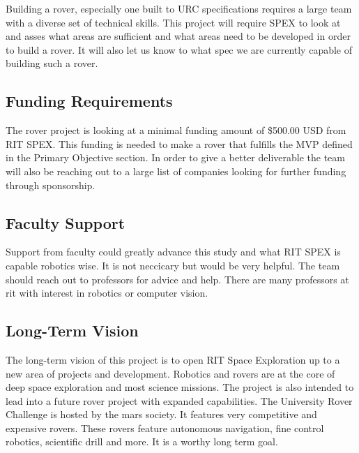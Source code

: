 \documentclass[conference]{IEEEtran} %
\begin{document}
Building a rover, especially one built to URC specifications requires a large team with a diverse set of technical skills. 
This project will require SPEX to look at and asses what areas are sufficient and what areas need to be developed in order to build a rover. 
It will also let us know to what spec we are currently capable of building such a rover. 

\subsection{Funding Requirements}

The rover project is looking at a minimal funding amount of \$500.00 USD from RIT SPEX. This funding is needed to make a rover that fulfills the MVP defined in the Primary Objective section. In order to give a better deliverable the team will also be reaching out to a large list of companies looking for further funding through sponsorship. 

\subsection{Faculty Support}
Support from faculty could greatly advance this study and what RIT SPEX is capable robotics wise. It is not neccicary but would be very helpful. The team should reach out to professors for advice and help. There are many professors at rit with interest in robotics or computer vision.

\subsection{Long-Term Vision}
\label{sec:vision}
The long-term vision of this project is to open RIT Space Exploration up to a new area of projects and development. 
Robotics and rovers are at the core of deep space exploration and most science missions. 
The project is also intended to lead into a future rover project with expanded capabilities.
The University Rover Challenge is hosted by the mars society. 
It features very competitive and expensive rovers. 
These rovers feature autonomous navigation, fine control robotics, scientific drill and more. 
It is a worthy long term goal. 
\end{document}
